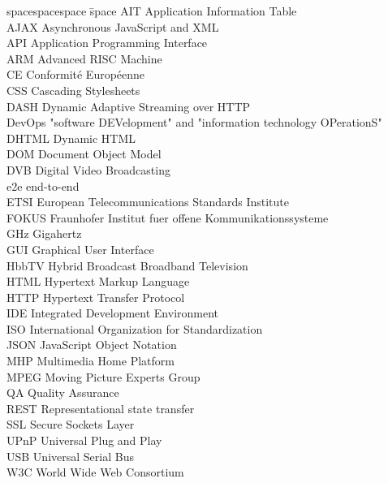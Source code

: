 
\begin{tabbing}
spacespacespace \= space \kill
AIT \> Application Information Table\\
AJAX \> Asynchronous JavaScript and XML\\
API \> Application Programming Interface\\
ARM \> Advanced RISC Machine\\
CE \> Conformité Européenne\\
CSS \> Cascading Stylesheets\\
DASH \> Dynamic Adaptive Streaming over HTTP\\
DevOps \> "software DEVelopment" and "information technology OPerationS"\\
DHTML \> Dynamic HTML\\
DOM \> Document Object Model\\
DVB \> Digital Video Broadcasting\\
e2e \> end-to-end\\
ETSI \> European Telecommunications Standards Institute\\
FOKUS \> Fraunhofer Institut fuer offene Kommunikationssysteme\\
GHz \> Gigahertz\\
GUI \> Graphical User Interface\\
HbbTV \> Hybrid Broadcast Broadband Television\\
HTML \> Hypertext Markup Language\\
HTTP \> Hypertext Transfer Protocol\\
IDE \> Integrated Development Environment\\
ISO \> International Organization for Standardization\\
JSON \> JavaScript Object Notation\\
MHP \> Multimedia Home Platform\\
MPEG \> Moving Picture Experts Group\\
QA \> Quality Assurance\\
REST \> Representational state transfer\\
SSL \> Secure Sockets Layer\\
UPnP \> Universal Plug and Play\\
USB \> Universal Serial Bus\\
W3C \> World Wide Web Consortium\\
\end{tabbing}
\endinput
